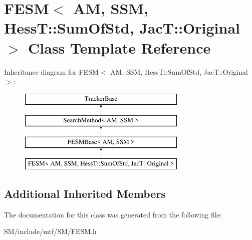 \hypertarget{classFESM_3_01AM_00_01SSM_00_01HessT_1_1SumOfStd_00_01JacT_1_1Original_01_4}{\section{F\-E\-S\-M$<$ A\-M, S\-S\-M, Hess\-T\-:\-:Sum\-Of\-Std, Jac\-T\-:\-:Original $>$ Class Template Reference}
\label{classFESM_3_01AM_00_01SSM_00_01HessT_1_1SumOfStd_00_01JacT_1_1Original_01_4}
}
Inheritance diagram for F\-E\-S\-M$<$ A\-M, S\-S\-M, Hess\-T\-:\-:Sum\-Of\-Std, Jac\-T\-:\-:Original $>$\-:\begin{figure}[H]
\begin{center}
\leavevmode
\includegraphics[height=4.000000cm]{classFESM_3_01AM_00_01SSM_00_01HessT_1_1SumOfStd_00_01JacT_1_1Original_01_4}
\end{center}
\end{figure}
\subsection*{Additional Inherited Members}


The documentation for this class was generated from the following file\-:\begin{DoxyCompactItemize}
\item 
S\-M/include/mtf/\-S\-M/F\-E\-S\-M.\-h\end{DoxyCompactItemize}
